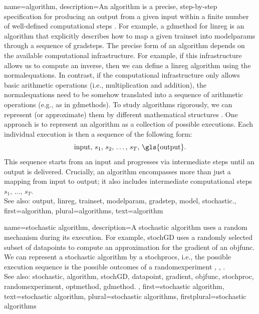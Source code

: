 {name={algorithm},
 	description={An algorithm is a precise, step-by-step specification for 
  		producing an \gls{output} from a given input within a finite number of well-defined 
		computational steps \cite{Cormen:2022aa}. For example, a \gls{gdmethod} for \gls{linreg} 
		is an algorithm that explicitly describes how to map a given \gls{trainset} 
		into \glspl{modelparam} through a sequence of \glspl{gradstep}. The precise form of 
		an algorithm depends on the available computational infrastructure. For example, if 
		this infrastructure allows us to compute an \gls{inverse}, then we can 
		define a \gls{linreg} algorithm using the \gls{normalequations}. In contrast, if 
		the computational infrastructure only allows basic arithmetic operations (i.e., multiplication and addition), 
		the \gls{normalequations} need to be somehow translated into a sequence of arithmetic 
		operations (e.g., as in \glspl{gdmethod}). 
		To study algorithms rigorously, we can represent (or approximate) them by different 
		mathematical structures \cite{Sipser2013}. One approach is to represent an algorithm 
		as a collection of possible executions. Each individual execution is then a 
		\gls{sequence} of the following form: $${\rm input}, \,s_1, \,s_2, \,\ldots, \,s_T, \,{\rm \gls{output}}.$$ 
		This sequence starts from an input and progresses via intermediate steps until an 
		\gls{output} is delivered. Crucially, an algorithm encompasses more than just a mapping 
		from input to \gls{output}; it also includes intermediate computational 
     		steps $s_1, \,\ldots, \,s_T$.
				\\ 
		See also: \gls{output}, \gls{linreg}, \gls{trainset}, \gls{modelparam}, \gls{gradstep}, \gls{model}, \gls{stochastic}.},
	first={algorithm},
	plural={algorithms},
	text={algorithm} 
}

{name={stochastic algorithm},
	description={A \gls{stochastic} \gls{algorithm} uses a random mechanism 
		during its execution. For example, \gls{stochGD} uses a randomly selected subset of \glspl{datapoint} 
		to compute an approximation for the \gls{gradient} of an \gls{objfunc}. We can represent a 
		\gls{stochastic} \gls{algorithm} by a \glspl{stochproc}, i.e., the possible execution \gls{sequence} is the possible \glspl{outcome} of 
		a \gls{randomexperiment} \cite{BertsekasProb}, \cite{RandomizedAlgos}, \cite{Gallager13}.		
		\\ 
		See also: \gls{stochastic}, \gls{algorithm}, \gls{stochGD}, \gls{datapoint}, \gls{gradient}, \gls{objfunc}, \gls{stochproc}, 
		\gls{randomexperiment}, \gls{optmethod}, \gls{gdmethod}. },
	first={stochastic algorithm},
	text={stochastic algorithm},
	plural={stochastic algorithms},
	firstplural={stochastic algorithms}
}


